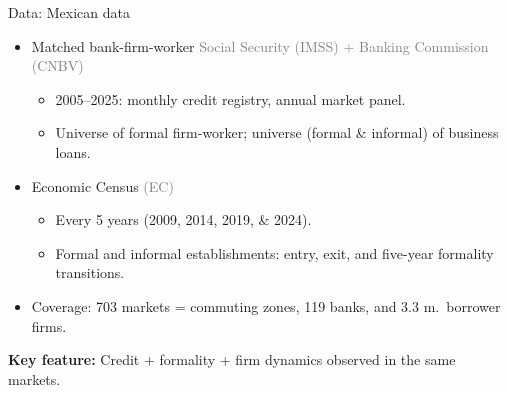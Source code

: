 \documentclass[aspectratio=169]{beamer}
\begin{document}
\begin{frame}{Data: Mexican data}\label{data}
 
\begin{itemize}
    \item Matched bank-firm-worker \textcolor{gray}{Social Security (IMSS) + Banking Commission (CNBV)}
    \begin{itemize}
        \item 2005--2025: monthly credit registry, annual market panel.
        \item Universe of formal firm-worker; universe (formal \& informal) of business loans.
    \end{itemize}
    \vspace{3mm}
    \pause
 
    \item Economic Census \textcolor{gray}{(EC)}
    \begin{itemize}
        \item Every 5 years (2009, 2014, 2019, \& 2024).
        \item Formal and informal establishments: entry, exit, and five-year formality transitions.
    \end{itemize}
    \vspace{3mm}
    \pause
 
    \item Coverage: 703 markets = commuting zones, 119 banks, and 3.3 m.\ borrower firms.
\end{itemize}
\vspace{3mm}
\pause
 
\begin{center}
    \large \textbf{Key feature:} Credit + formality + firm dynamics observed in the same markets.
\end{center}
 
\end{frame}
 
 
 
 
 
\end{document}
